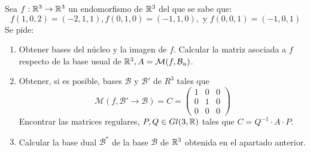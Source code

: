 \documentclass[12pt]{article}
\begin{document}
    \begin{ejercicio}[4 puntos]
        Sea $f: {\mathbb{R}}^3 \rightarrow {\mathbb{R}}^3$ un endomorfismo de ${\mathbb{R}}^3$ del que se sabe que:
        \begin{equation*}
            f(1, 0 , 2) = (-2, 1, 1), f(0, 1, 0) = (-1, 1, 0), \text{ y } f(0, 0, 1) = (-1, 0, 1)
        \end{equation*}
        Se pide:
        \begin{enumerate}[label=\alph*.]
            \item Obtener bases del núcleo y la imagen de $f$. Calcular la matriz asociada a $f$ respecto de la base usual de ${\mathbb{R}}^3, A=\mathcal{M}(f, \mathcal{B}_u)$.
        \item Obtener, si es posible, bases $\mathcal{B}$ y $\mathcal{B}'$ de $R^3$ tales que
            \begin{equation*}
                \mathcal{M}(f, \mathcal{B'} \rightarrow \mathcal{B}) = C = \begin{pmatrix}
                    1 & 0 & 0 \\
                    0 & 1 & 0 \\
                    0 & 0 & 0
                \end{pmatrix}
            \end{equation*}
            Encontrar las matrices regulares, $P, Q \in Gl(3, {\mathbb{R}})$ tales que $C = Q^{-1} \cdot A \cdot P$.
        \item Calcular la base dual $\mathcal{B}^*$ de la base $\mathcal{B}$ de ${\mathbb{R}}^3$ obtenida en el apartado anterior.
        \end{enumerate}
    \end{ejercicio}

    \newpage
    \setcounter{ejercicio}{0} %
\end{document}
